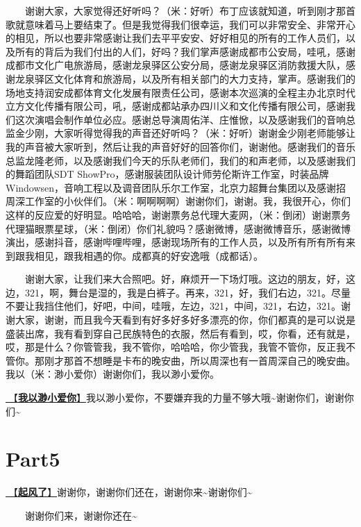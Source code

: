 \documentclass[]{ctexbook}
\begin{document}
  谢谢大家，大家觉得还好听吗？（米：好听）布丁应该就知道，听到刚才那首歌就意味着马上要结束了。但是我觉得我们很幸运，我们可以非常安全、非常开心的相见，所以也要非常感谢让我们去平平安安、好好相见的所有的工作人员们，以及所有的背后为我们付出的人们，好吗？我们掌声感谢成都市公安局，哇吼，感谢成都市文化广电旅游局，感谢龙泉驿区公安分局，感谢龙泉驿区消防救援大队，感谢龙泉驿区文化体育和旅游局，以及所有相关部门的大力支持，掌声。感谢我们的场地支持润安成都体育文化发展有限责任公司，感谢本次巡演的全程主办北京时代立方文化传播有限公司，吼，感谢成都站承办四川义和文化传播有限公司，感谢我们这次演唱会制作单位必应。感谢总导演周佑洋、庄惟惞，以及感谢我们的音响总监金少刚，大家听得觉得我的声音还好听吗？（米：好听）谢谢金少刚老师能够让我的声音被大家听到，然后让我的声音好好的回答你们，谢谢他。感谢我们的音乐总监龙隆老师，以及感谢我们今天的乐队老师们，我们的和声老师，以及感谢我们的舞蹈团队SDT ShowPro，感谢服装团队设计师劳伦斯许工作室，时装品牌Windowsen，音响工程以及调音团队乐尔工作室，北京力超舞台集团以及感谢招周深工作室的小伙伴们。（米：啊啊啊啊）谢谢你们，谢谢。我，我很开心，你们这样的反应爱的好明显。哈哈哈，谢谢票务总代理大麦网，（米：倒闭）谢谢票务代理猫眼票星球，（米：倒闭）你们礼貌吗？感谢微博，感谢微博音乐，感谢微博演出，感谢抖音，感谢哔哩哔哩，感谢现场所有的工作人员，以及所有所有所有来到跟我相见，跟我相遇的你。成都真的好安逸哦（成都话）。

  谢谢大家，让我们来大合照吧。好，麻烦开一下场灯哦。这边的朋友，好，这边，321，啊，舞台是湿的，我是白裤子。再来，321，好，我们右边，321。尽量不要让我挡住他们，好吧，中间，哇哦，左边，321，中间，321，右边，321。谢谢大家，谢谢，而且我今天看到有好多好多好多漂亮的你，你们都真的是可以说是盛装出席，我有看到穿自己民族特色的衣服，然后有看到，哎，你看，还有就是，哎，那是什么？你管管我，我不管你，哈哈哈，你少管我，我管不管你，反正我不管你。那刚才那首不想睡是卡布的晚安曲，所以周深也有一首周深自己的晚安曲。我以（米：渺小爱你）谢谢你们，我以渺小爱你。

\hyperref[loving-you-in-my-humble-way]{🎵【\textbf{我以渺小爱你}】}我以渺小爱你，不要嫌弃我的力量不够大哦\textasciitilde 谢谢你们，谢谢你们\textasciitilde{}

\section{Part5}\label{chengdu-20240615-part5}

\hyperref[the-wind-rises]{🎵【\textbf{起风了}】}谢谢你，谢谢你们还在，谢谢你来\textasciitilde 谢谢你们\textasciitilde{}

  谢谢你们来，谢谢你还在\textasciitilde{}
\end{document}
